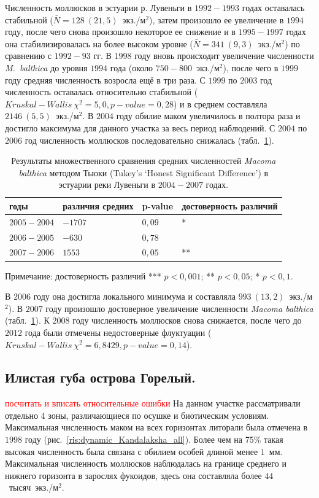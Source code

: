 \documentclass[12pt, a4paper]{disser}
\begin{document}
Численность моллюсков в эстуарии р. Лувеньги в $1992-1993$ годах оставалась стабильной ($\bar{N} = 128~(21,5)$~экз./м$^2$), затем произошло ее увеличение в $1994$ году, после чего снова произошло некоторое ее снижение и в $1995 - 1997$ годах она стабилизировалась на более высоком уровне ($\bar{N} = 341~(9,3)$~экз./м$^2$) по сравнению с $1992 - 93$ гг.
В $1998$ году вновь происходит увеличение численности {\it M.~balthica} до уровня $1994$ года (около $750 - 800$~экз./м$^2$), после чего в $1999$ году средняя численность возросла ещё в три раза.
С $1999$ по $2003$ год численность оставалась относительно стабильной  ($Kruskal-Wallis\ \chi^2 = 5,0, p-value = 0,28$) и в среднем составляла $2146~(5,5)$~экз./м$^2$.
В $2004$ году обилие маком увеличилось в полтора раза и достигло максимума для данного участка за весь период наблюдений. 
С $2004$ по $2006$ год численность моллюсков последовательно снижалась (табл.~\ref {tab:Tukey_estuary_04_07_n2}). 
	\begin{table}
	\begin{tabular}{|*{4}{p{}|}} \hline
	годы & различия средних & p-value & достоверность различий\\
	\hline
	$2005-2004$ & $-1707$ & $0,09$ & *\\
	\hline
	$2006-2005$ & $-630$ & $0,78$ & \\
	\hline
	$2007-2006$ & $1553$ & $0,05$ & **\\
	\hline
	\end{tabular}

	{\footnotesize Примечание: достоверность различий *** \textemdash $p<0,001$; ** \textemdash $p<0,05$; * \textemdash $p<0,1$.}
	\caption{Результаты множественного сравнения средних численностей {\it Macoma balthica} методом Тьюки (Tukey's ‘Honest Significant Difference’) в эстуарии реки Лувеньги в $2004-2007$ годах.}
	\label{tab:Tukey_estuary_04_07_n2}
	\end{table}
В $2006$ году она достигла локального минимума и составляла $993~(13,2)$~экз./м$^2$). 
В $2007$ году произошло достоверное увеличение численности {\it Macoma balthica} (табл.~\ref {tab:Tukey_estuary_04_07_n2}).
К $2008$ году численность моллюсков снова снижается, после чего до $2012$ года были отмечены недостоверные флуктуации ($Kruskal-Wallis\ \chi^2 = 6,8429, p-value = 0,14$).

		\subsection{Илистая губа острова Горелый.}
\textcolor{red}{посчитать и вписать относительные ошибки}
На данном участке рассматривали отдельно 4 зоны, различающиеся по осушке и биотическим условиям. 
Максимальная численность маком на всех горизонтах литорали была отмечена в $1998$ году (рис.~\ref{ris:dynamic_Kandalaksha_all}).
Более чем на 75\% такая высокая численность была связана с обилием особей длиной менее $1$~мм.
Максимальная численность моллюсков наблюдалась на границе среднего и нижнего горизонта в зарослях фукоидов, здесь она составляла более $44$~тысяч~экз./м$^2$.
\end{document}
